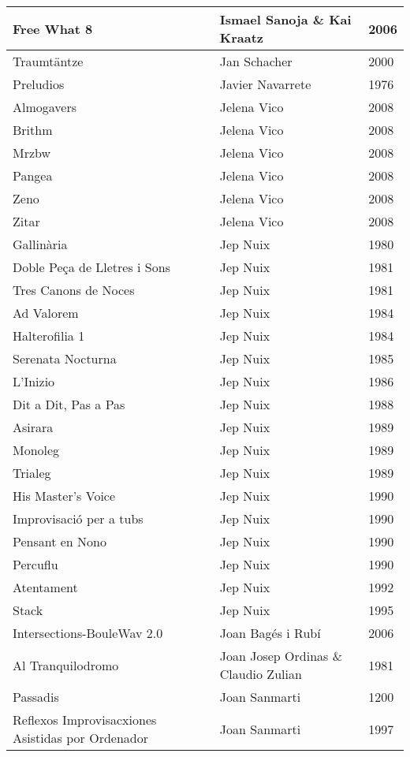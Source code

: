 \begin{center}
\begin{longtable}{ p{}  p{}  p{} }
Free What 8 & Ismael Sanoja \& Kai Kraatz & 2006 \\ \midrule 
Traumtäntze & Jan Schacher & 2000 \\ \midrule 
Preludios & Javier Navarrete & 1976 \\ \midrule 
Almogavers & Jelena Vico & 2008 \\ \midrule 
Brithm & Jelena Vico & 2008 \\ \midrule 
Mrzbw & Jelena Vico & 2008 \\ \midrule 
Pangea & Jelena Vico & 2008 \\ \midrule 
Zeno & Jelena Vico & 2008 \\ \midrule 
Zitar & Jelena Vico & 2008 \\ \midrule 
Gallinària & Jep Nuix & 1980 \\ \midrule 
Doble Peça de Lletres i Sons & Jep Nuix & 1981 \\ \midrule 
Tres Canons de Noces & Jep Nuix & 1981 \\ \midrule 
Ad Valorem & Jep Nuix & 1984 \\ \midrule 
Halterofilia 1 & Jep Nuix & 1984 \\ \midrule 
Serenata Nocturna & Jep Nuix & 1985 \\ \midrule 
L'Inizio & Jep Nuix & 1986 \\ \midrule 
Dit a Dit, Pas a Pas & Jep Nuix & 1988 \\ \midrule 
Asirara & Jep Nuix & 1989 \\ \midrule 
Monoleg & Jep Nuix & 1989 \\ \midrule 
Trialeg & Jep Nuix & 1989 \\ \midrule 
His Master's Voice & Jep Nuix & 1990 \\ \midrule 
Improvisació per a tubs & Jep Nuix & 1990 \\ \midrule 
Pensant en Nono & Jep Nuix & 1990 \\ \midrule 
Percuflu & Jep Nuix & 1990 \\ \midrule 
Atentament & Jep Nuix & 1992 \\ \midrule 
Stack & Jep Nuix & 1995 \\ \midrule 
Intersections-BouleWav 2.0 & Joan Bagés i Rubí & 2006 \\ \midrule 
Al Tranquilodromo & Joan Josep Ordinas \& Claudio Zulian & 1981 \\ \midrule 
Passadis & Joan Sanmarti & 1200 \\ \midrule 
Reflexos Improvisacxiones Asistidas por Ordenador & Joan Sanmarti & 1997 \\ \midrule 

\end{longtable}
\end{center}
